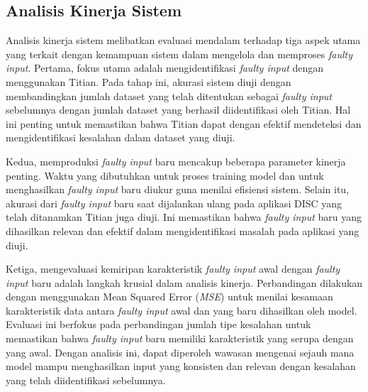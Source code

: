   \subsection{Analisis Kinerja Sistem}
  \label{subsec:analisiskinerjasistem}
  Analisis kinerja sistem melibatkan evaluasi mendalam terhadap tiga aspek utama yang terkait dengan kemampuan sistem dalam mengelola dan memproses \emph{faulty input}. Pertama, fokus utama adalah mengidentifikasi \emph{faulty input} dengan menggunakan Titian. Pada tahap ini, akurasi sistem diuji dengan membandingkan jumlah dataset yang telah ditentukan sebagai \emph{faulty input} sebelumnya dengan jumlah dataset yang berhasil diidentifikasi oleh Titian. Hal ini penting untuk memastikan bahwa Titian dapat dengan efektif mendeteksi dan mengidentifikasi kesalahan dalam dataset yang diuji.

  Kedua, memproduksi \emph{faulty input} baru mencakup beberapa parameter kinerja penting. Waktu yang dibutuhkan untuk proses training model dan untuk menghasilkan \emph{faulty input} baru diukur guna menilai efisiensi sistem. Selain itu, akurasi dari \emph{faulty input} baru saat dijalankan ulang pada aplikasi DISC yang telah ditanamkan Titian juga diuji. Ini memastikan bahwa \emph{faulty input} baru yang dihasilkan relevan dan efektif dalam mengidentifikasi masalah pada aplikasi yang diuji.

  Ketiga, mengevaluasi kemiripan karakteristik \emph{faulty input} awal dengan \emph{faulty input} baru adalah langkah krusial dalam analisis kinerja. Perbandingan dilakukan dengan menggunakan Mean Squared Error (\emph{MSE}) untuk menilai kesamaan karakteristik data antara \emph{faulty input} awal dan yang baru dihasilkan oleh model. Evaluasi ini berfokus pada perbandingan jumlah tipe kesalahan untuk memastikan bahwa \emph{faulty input} baru memiliki karakteristik yang serupa dengan yang awal. Dengan analisis ini, dapat diperoleh wawasan mengenai sejauh mana model mampu menghasilkan input yang konsisten dan relevan dengan kesalahan yang telah diidentifikasi sebelumnya.

